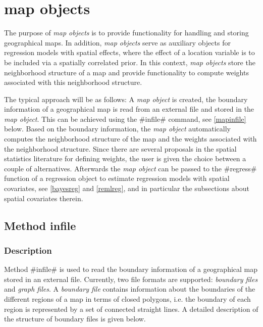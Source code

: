 \chapter{map objects}
\label{map} 

The purpose of {\em map objects} is to provide functionality for
handling and storing geographical maps. In addition, {\em map
objects} serve as auxiliary objects for regression models with
spatial effects, where the effect of a location variable is to be
included via a spatially correlated prior. In this context, {\em
map objects} store the neighborhood structure of a map and provide
functionality to compute weights associated with this neighborhood
structure.

The typical approach will be as follows: A {\em map object} is
created, the boundary information of a geographical map is read
from an external file and stored in the {\em map object}. This can
be achieved using the #infile# command, see \autoref{mapinfile}
below. Based on the boundary information, the {\em map object}
automatically computes the neighborhood structure of the map and
the weights associated with the neighborhood structure. Since
there are several proposals in the spatial statistics literature
for defining weights, the user is given the choice between a
couple of alternatives. Afterwards the {\em map object} can be
passed to the #regress# function of a regression object to
estimate regression models with spatial covariates, see
\autoref{bayesreg} and \autoref{remlreg}, and in particular the
subsections about spatial covariates therein.

\clearpage



\section{Method infile}
\label{mapinfile}    
 

\subsection{Description}


Method #infile# is used to read the boundary information of a
geographical map stored in an external file. Currently, two file
formats are supported: {\em boundary files} and {\em graph files}.
A {\em boundary file} contains information about the boundaries of
the different regions of a map in terms of closed polygons, i.e.
the boundary of each region is represented by a set of connected
straight lines. A detailed description of the structure of
boundary files is given below.

